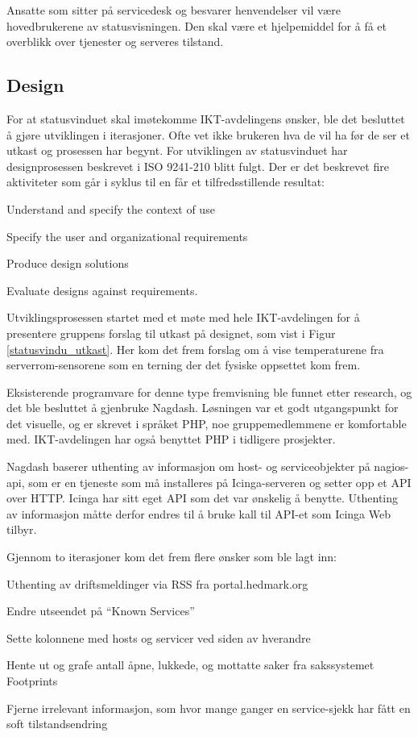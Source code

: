 Ansatte som sitter på servicedesk og besvarer henvendelser vil være hovedbrukerene av statusvisningen. Den skal være et hjelpemiddel for å få et overblikk over tjenester og serveres tilstand.

\subsection{Design}
For at statusvinduet skal imøtekomme IKT-avdelingens ønsker, ble det besluttet å gjøre utviklingen i iterasjoner. Ofte vet ikke brukeren hva de vil ha før de ser et utkast og prosessen har begynt. For utviklingen av statusvinduet har designprosessen beskrevet i ISO 9241-210 blitt fulgt. Der er det beskrevet fire aktiviteter som går i syklus til en får et tilfredsstillende resultat:
\begin{itemize*}
	\item Understand and specify the context of use
	\item Specify the user and organizational requirements
	\item Produce design solutions
	\item Evaluate designs against requirements.
\end{itemize*}

Utviklingsprosessen startet med et møte med hele IKT-avdelingen for å presentere gruppens forslag til utkast på designet, som vist i Figur \ref{statusvindu_utkast}. Her kom det frem forslag om å vise temperaturene fra serverrom-sensorene som en terning der det fysiske oppsettet kom frem.

Eksisterende programvare for denne type fremvisning ble funnet etter research, og det ble besluttet å gjenbruke Nagdash\cite{nagdash}. Løsningen var et godt utgangspunkt for det visuelle, og er skrevet i språket PHP, noe gruppemedlemmene er komfortable med. IKT-avdelingen har også benyttet PHP i tidligere prosjekter. 

Nagdash baserer uthenting av informasjon om host- og serviceobjekter på nagios-api\cite{nagiosapi}, som er en tjeneste som må installeres på Icinga-serveren og setter opp et API over HTTP. Icinga har sitt eget API som det var ønskelig å benytte. Uthenting av informasjon måtte derfor endres til å bruke kall til API-et som Icinga Web tilbyr\cite{icingarestapi}.

Gjennom to iterasjoner kom det frem flere ønsker som ble lagt inn:
\begin{itemize*}
	 \item Uthenting av driftsmeldinger via RSS fra portal.hedmark.org
	 \item Endre utseendet på ``Known Services''
	 \item Sette kolonnene med hosts og servicer ved siden av hverandre 
	 \item Hente ut og grafe antall åpne, lukkede, og mottatte saker fra sakssystemet Footprints
	 \item Fjerne irrelevant informasjon, som hvor mange ganger en service-sjekk har fått en soft tilstandsendring
\end{itemize*}

